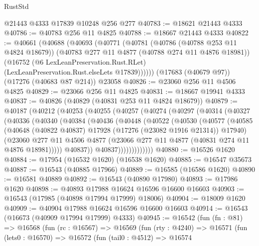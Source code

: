 \begin{lexlean}{RustStd}
\begin{coremodule}
    @21443
    @4333
    @17839
    @10248
    @256
    @277
@40783 := @18621 @21443 @4333
@40786 := @40783 @256 @11 @4825
@40788 := @18667 @21443 @4333
@40822 := @40661
    (@40688
      (@40693
        (@40771
          (@40781
            (@40786 (@40788 @253 @11 @4824 @18679))
            (@40783 @277 @11 @4877 (@40788 @274 @11 @4876 @18981))
            (@16752
              (@6 LexLeanPreservation.Rust.RLet)
              (LexLeanPreservation.Rust.elseLets @17839))))))
    (@17683 (@40679 @97))
    (@17276 (@40683 @87 @214))
    @23058
@40826 := @23060 @256 @11 @4506 @4825
@40829 := @23066 @256 @11 @4825
@40831 := @18667 @19941 @4333
@40837 := @40826 (@40829 (@40831 @253 @11 @4824 @18679))
@40879 := @40187
    (@40212
      (@40253
        (@40255
          (@40257
            (@40274
              (@40297
                (@40314
                  (@40327
                    (@40336
                      (@40340
                        (@40384
                          (@40436
                            (@40448
                              (@40522
                                (@40530
                                  (@40577
                                    (@40585
                                      (@40648
                                        (@40822 @40837)
                                        @17928
                                        (@17276 (@23082 @1916 @21314))
                                        @17940)
                                      (@23060
                                        @277
                                        @11
                                        @4506
                                        @4877
                                        (@23066 @277 @11 @4877 (@40831 @274 @11 @4876 @18981)))))
                                  @40837))
                              @40837)))))))))))))
@40880 := @16526 @1620
@40884 := @17954 (@16532 @1620) (@16538 @1620)
@40885 := @16547 @35673
@40887 := @16543 (@40885 @17966)
@40889 := @16585 (@16586 @1620)
@40890 := @16581 @40889
@40892 := @16543 (@40890 @17980)
@40893 := @17986 @1620
@40898 := @40893 @17988 @16624 @16596 @16600 @16603
@40903 := @16543 (@17985 (@40898 @17994 @17999) @18006)
@40904 := @18009 @1620
@40909 := @40904 @17988 @16624 @16596 @16600 @16603
@40914 := @16543 (@16673 (@40909 @17994 @17999) @4333)
@40945 := @16542
    (fun (fn : @81) =>
    @16568
      (fun (rc : @16567) =>
      @16569
        (fun (rty : @4240) =>
        @16571
          (fun (lets0 : @16570) =>
          @16572
            (fun (tail0 : @4512) =>
            @16574

\end{coremodule}
\end{lexlean}
